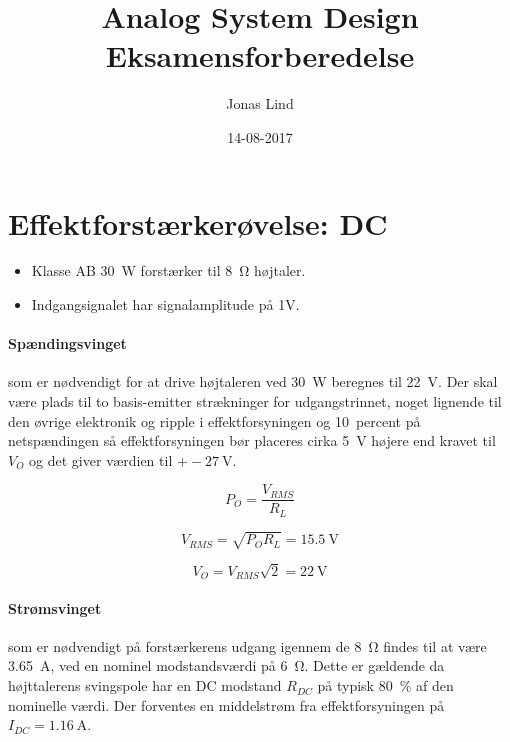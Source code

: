 \documentclass[danish]{article}
\begin{document}
\title{\textbf{Analog System Design} \\Eksamensforberedelse}
\author{Jonas Lind}
\date{14-08-2017}
\maketitle
\tableofcontents
\newpage

\section{Effektforstærkerøvelse: DC}
\begin{itemize}
	\item Klasse AB \SI{30}{\watt} forstærker til \SI{8}{\ohm} højtaler.
	\item Indgangsignalet har signalamplitude på 1V.
\end{itemize}

\paragraph{Spændingsvinget} som er nødvendigt for at drive højtaleren ved \SI{30}{\watt} beregnes til \SI{22}{\volt}. Der skal være plads til to basis-emitter strækninger for udgangstrinnet, noget lignende til den øvrige elektronik og ripple i effektforsyningen og  \SI{10}{percent}  på netspændingen så effektforsyningen bør placeres cirka \SI{5}{\volt} højere end kravet til $V_O$ og det giver værdien til $+-\SI{27}{\volt}$.

\begin{equation}
P_O = \dfrac{V_{RMS}}{R_L}
\end{equation}

\begin{equation}
V_{RMS} = \sqrt{P_O R_L} = \SI{15.5}{\volt}
\end{equation}

\begin{equation}
V_O = V_{RMS} \sqrt{2} = \SI{22}{\volt}
\end{equation}

\paragraph{Strømsvinget} som er nødvendigt på forstærkerens udgang igennem de \SI{8}{\ohm} findes til at være \SI{3.65}{\ampere}, ved en nominel modstandsværdi på \SI{6}{\ohm}. Dette er gældende da højttalerens svingspole har en DC modstand $R_{DC}$ på typisk \SI{80}{\percent}  af den nominelle værdi. Der forventes en middelstrøm fra effektforsyningen på $I_{DC} = \SI{1.16}{\ampere}$.
\end{document}
